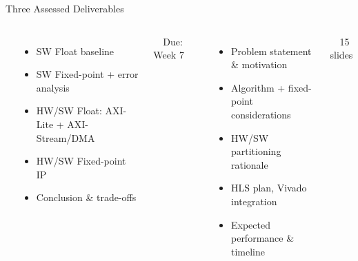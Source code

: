 \documentclass[10pt,aspectratio=169]{beamer}
\begin{document}
\begin{frame}{Three Assessed Deliverables}
\vspace{-0.1cm}
\begin{columns}[T,totalwidth=\textwidth]

\column{\dimexpr\textwidth/3\relax}
\colorbox{Navy}{}\\[-1pt]
\colorbox{Navy!80}{}
\vspace{3pt}

\begin{itemize}\small\color{TxtMd}
  \item SW Float baseline
  \item SW Fixed-point + error analysis
  \item HW/SW Float: AXI-Lite + AXI-Stream/DMA
  \item HW/SW Fixed-point IP
  \item Conclusion \& trade-offs
\end{itemize}

\vspace{6pt}
\colorbox{Navy}{}
\textcolor{TxtMd}{\small\ \ Due: Week 7}

\column{\dimexpr\textwidth/3\relax}
\colorbox{Blue}{}\\[-1pt]
\colorbox{Blue!80}{}
\vspace{3pt}

\begin{itemize}\small\color{TxtMd}
  \item Problem statement \& motivation
  \item Algorithm + fixed-point considerations
  \item HW/SW partitioning rationale
  \item HLS plan, Vivado integration
  \item Expected performance \& timeline
\end{itemize}

\vspace{6pt}
\colorbox{Blue}{}
\textcolor{TxtMd}{\small\ \ 15 slides}


\end{columns}
\end{frame}
\end{document}
